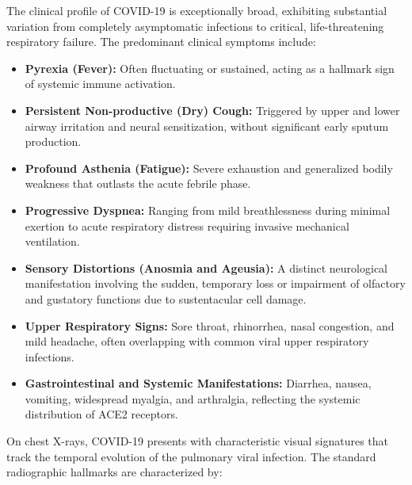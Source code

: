 The clinical profile of COVID-19 is exceptionally broad, exhibiting substantial variation from completely asymptomatic infections to critical, life-threatening respiratory failure. The predominant clinical symptoms include:

\begin{itemize}
	\item \textbf{Pyrexia (Fever):} Often fluctuating or sustained, acting as a hallmark sign of systemic immune activation.
	\item \textbf{Persistent Non-productive (Dry) Cough:} Triggered by upper and lower airway irritation and neural sensitization, without significant early sputum production.
	\item \textbf{Profound Asthenia (Fatigue):} Severe exhaustion and generalized bodily weakness that outlasts the acute febrile phase.
	\item \textbf{Progressive Dyspnea:} Ranging from mild breathlessness during minimal exertion to acute respiratory distress requiring invasive mechanical ventilation.
	\item \textbf{Sensory Distortions (Anosmia and Ageusia):} A distinct neurological manifestation involving the sudden, temporary loss or impairment of olfactory and gustatory functions due to sustentacular cell damage.
	\item \textbf{Upper Respiratory Signs:} Sore throat, rhinorrhea, nasal congestion, and mild headache, often overlapping with common viral upper respiratory infections.
	\item \textbf{Gastrointestinal and Systemic Manifestations:} Diarrhea, nausea, vomiting, widespread myalgia, and arthralgia, reflecting the systemic distribution of ACE2 receptors.
\end{itemize}

On chest X-rays, COVID-19 presents with characteristic visual signatures that track the temporal evolution of the pulmonary viral infection. The standard radiographic hallmarks are characterized by:

